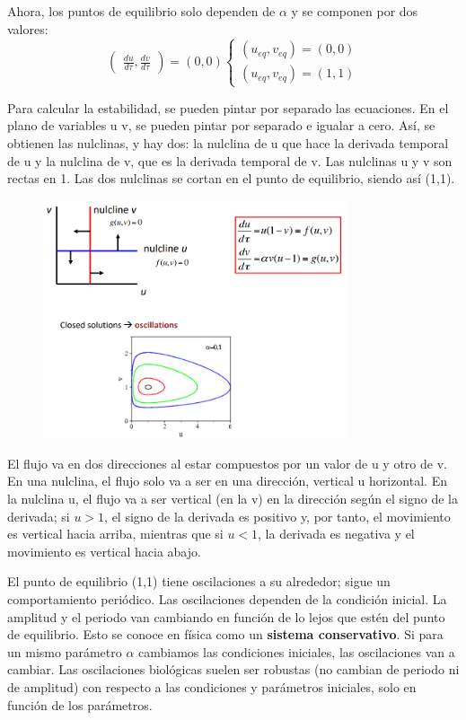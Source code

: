 Ahora, los puntos de equilibrio solo dependen de $\alpha$ y se componen por dos valores:
$$\begin{pmatrix}
\frac{du}{d\tau}, \frac{dv}{d\tau}
\end{pmatrix} = (0,0) \begin{cases}
(u_{eq}, v_{eq}) = (0,0) \\
(u_{eq}, v_{eq}) = (1,1) 
\end{cases}$$

Para calcular la estabilidad, se pueden pintar por separado las ecuaciones. En el plano de variables u v, se pueden pintar por separado e igualar a cero. Así, se obtienen las nulclinas, y hay dos: la nulclina de u que hace la derivada temporal de u y la nulclina de v, que es la derivada temporal de v. Las nulclinas u y v son rectas en 1. Las dos nulclinas se cortan en el punto de equilibrio, siendo así (1,1).

\begin{figure}[h]
\centering
\includegraphics[width = 0.8\textwidth]{figs/nulclinas.png}
\end{figure}

El flujo va en dos direcciones al estar compuestos por un valor de u y otro de v. En una nulclina, el flujo solo va a ser en una dirección, vertical u horizontal. En la nulclina u, el flujo va a ser vertical (en la v) en la dirección según el signo de la derivada; si $u > 1$, el signo de la derivada es positivo y, por tanto, el movimiento es vertical hacia arriba, mientras que si $u < 1$, la derivada es negativa y el movimiento es vertical hacia abajo. 

El punto de equilibrio (1,1) tiene oscilaciones a su alrededor; sigue un comportamiento periódico. Las oscilaciones dependen de la condición inicial. La amplitud y el periodo van cambiando en función de lo lejos que estén del punto de equilibrio. Esto se conoce en física como un \textbf{sistema conservativo}.
Si para un mismo parámetro $\alpha$ cambiamos las condiciones iniciales, las oscilaciones van a cambiar. Las oscilaciones biológicas suelen ser robustas (no cambian de periodo ni de amplitud) con respecto a las condiciones y parámetros iniciales, solo en función de los parámetros.